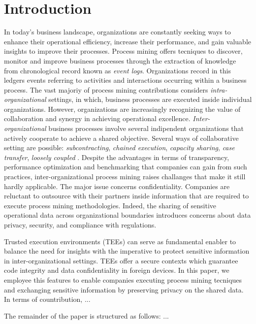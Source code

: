 \section{Introduction}
In today's business landscape, organizations are constantly seeking ways to enhance their operational efficiency, increase their performance, and gain valuable insights to improve their processes. Process mining offers tecniques to discover, monitor and improve business processes through the extraction of knowledge from chronological record known as \textit{event logs}. Organizations record in this ledgers events referring to activities and interactions occurring within a business process. The vast majoriy of process mining contributions considers \textit{intra-organizational} settings, in which, business processes are executed inside individual organizations. However, organizations are increasingly recognizing the value of collaboration and synergy in achieving operational excellence. \textit{Inter-organizational} business processes involve several indipendent organizations that actively cooperate to achieve a shared objective. Several ways of collaborative setting are possible: \textit{subcontracting}, \textit{chained execution}, \textit{capacity sharing}, \textit{case transfer}, \textit{loosely coupled} \cite{van1999process}. Despite the advantages in terms of transparency, performance optimization and benchmarking that companies can gain from such practices, inter-organizational process mining raises challanges that make it still hardly applicable. The major issue concerns confidentiality. Companies are reluctant to outsource with their partners inside information that are required to execute process mining methodologies. Indeed, the sharing of sensitive operational data across organizational boundaries introduces concerns about data privacy, security, and compliance with regulations. 

Trusted execution environments (TEEs) can serve as fundamental enabler to balance the need for insights with the imperative to protect sensitive information in inter-organizational settings. TEEs offer a secure contexts which guarantee code integrity and data confidentiality in foreign devices. In this paper, we employee this features to enable companies executing process mining tecniques and exchanging sensitive information by preserving privacy on the shared data. In terms of countribution, ...

The remainder of the paper is structured as follows: ...


